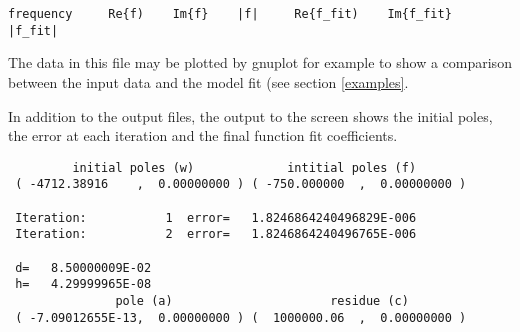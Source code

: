 \begin{verbatim}
frequency     Re{f)    Im{f}    |f|     Re{f_fit)    Im{f_fit}    |f_fit|      
\end{verbatim}

The data in this file may be plotted by gnuplot for example to show a comparison between the input data and the model fit (see section \ref{examples}.

In addition to the output files, the output to the screen shows the initial poles, the error at each iteration and the final function fit coefficients.

\begin{verbatim}
         initial poles (w)             intitial poles (f)           
 ( -4712.38916    ,  0.00000000 ) ( -750.000000  ,  0.00000000 )

 Iteration:           1  error=   1.8246864240496829E-006
 Iteration:           2  error=   1.8246864240496765E-006

 d=   8.50000009E-02
 h=   4.29999965E-08
               pole (a)                      residue (c)
 ( -7.09012655E-13,  0.00000000 ) (  1000000.06  ,  0.00000000 )
\end{verbatim}

